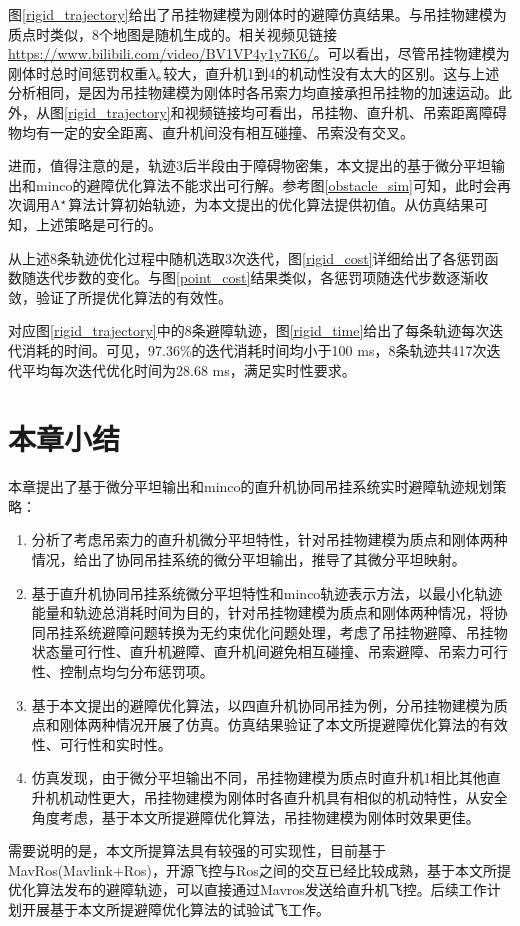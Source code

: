 图\ref{rigid_trajectory}给出了吊挂物建模为刚体时的避障仿真结果。与吊挂物建模为质点时类似，8个地图是随机生成的。相关视频见链接\href{https://www.bilibili.com/video/BV1VP4y1y7K6/}{https://www.bilibili.com/video/BV1VP4y1y7K6/}。可以看出，尽管吊挂物建模为刚体时总时间惩罚权重$\lambda_{\rm{e}}$较大，直升机1到4的机动性没有太大的区别。这与上述分析相同，是因为吊挂物建模为刚体时各吊索力均直接承担吊挂物的加速运动。此外，从图\ref{rigid_trajectory}和视频链接均可看出，吊挂物、直升机、吊索距离障碍物均有一定的安全距离、直升机间没有相互碰撞、吊索没有交叉。

进而，值得注意的是，轨迹3后半段由于障碍物密集，本文提出的基于微分平坦输出和minco的避障优化算法不能求出可行解。参考图\ref{obstacle_sim}可知，此时会再次调用$\rm{A}^\star$算法计算初始轨迹，为本文提出的优化算法提供初值。从仿真结果可知，上述策略是可行的。

从上述8条轨迹优化过程中随机选取3次迭代，图\ref{rigid_cost}详细给出了各惩罚函数随迭代步数的变化。与图\ref{point_cost}结果类似，各惩罚项随迭代步数逐渐收敛，验证了所提优化算法的有效性。

对应图\ref{rigid_trajectory}中的8条避障轨迹，图\ref{rigid_time}给出了每条轨迹每次迭代消耗的时间。可见，97.36\%的迭代消耗时间均小于100 ms，8条轨迹共417次迭代平均每次迭代优化时间为28.68 ms，满足实时性要求。

\section{本章小结}\label{Section6:conclusion}
本章提出了基于微分平坦输出和minco的直升机协同吊挂系统实时避障轨迹规划策略：
\begin{enumerate}
    \item 分析了考虑吊索力的直升机微分平坦特性，针对吊挂物建模为质点和刚体两种情况，给出了协同吊挂系统的微分平坦输出，推导了其微分平坦映射。
    \item 基于直升机协同吊挂系统微分平坦特性和minco轨迹表示方法，以最小化轨迹能量和轨迹总消耗时间为目的，针对吊挂物建模为质点和刚体两种情况，将协同吊挂系统避障问题转换为无约束优化问题处理，考虑了吊挂物避障、吊挂物状态量可行性、直升机避障、直升机间避免相互碰撞、吊索避障、吊索力可行性、控制点均匀分布惩罚项。
    \item 基于本文提出的避障优化算法，以四直升机协同吊挂为例，分吊挂物建模为质点和刚体两种情况开展了仿真。仿真结果验证了本文所提避障优化算法的有效性、可行性和实时性。
    \item 仿真发现，由于微分平坦输出不同，吊挂物建模为质点时直升机1相比其他直升机机动性更大，吊挂物建模为刚体时各直升机具有相似的机动特性，从安全角度考虑，基于本文所提避障优化算法，吊挂物建模为刚体时效果更佳。
\end{enumerate}

需要说明的是，本文所提算法具有较强的可实现性，目前基于MavRos(Mavlink+Ros)，开源飞控与Ros之间的交互已经比较成熟，基于本文所提优化算法发布的避障轨迹，可以直接通过Mavros发送给直升机飞控。后续工作计划开展基于本文所提避障优化算法的试验试飞工作。
